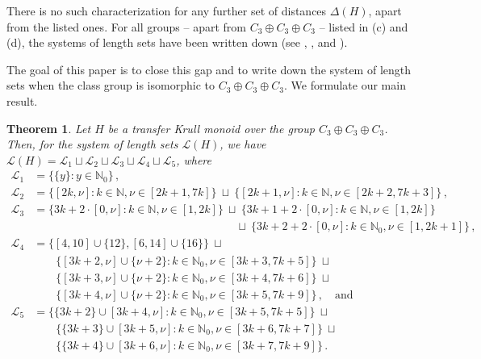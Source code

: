 \documentclass[a4paper, 10pt]{amsart}
\theoremstyle{plain}
\newtheorem{theorem}{\bf Theorem}[section]
\theoremstyle{definition}
\theoremstyle{definition}
\newcommand{\N}{\mathbb N}
\numberwithin{equation}{section}
\begin{document}
There is no such characterization for any further set of distances $\Delta (H)$, apart from the listed ones. For all groups -- apart from $C_3 \oplus C_3 \oplus C_3$ --  listed in (c) and (d), the systems of length sets have been written down (see \cite[Theorem 7.3.2]{Ge-HK06a}, \cite[Proposition 3.12]{Ge-Sc16b}, and \cite[Theorem 4.5]{Ge-Sc-Zh17b}).

The goal of this paper is to close this gap and to write down the system of length sets when the class group is isomorphic to $C_3 \oplus C_3 \oplus C_3$. We formulate our main result.


\begin{theorem} \label{1.1}
Let $H$ be a transfer Krull monoid over the group $C_3 \oplus C_3 \oplus C_3$. 
Then, for the system of length sets $\mathcal L (H)$, we have
$\mathcal L (H) = \mathcal L_1\sqcup \mathcal L_2\sqcup \mathcal L_3\sqcup \mathcal L_4\sqcup \mathcal L_5$, where
\begin{align*}
\mathcal L_1&= \big\{\{y\}\colon y\in \N_0  \big\}\,,\\
\mathcal L_2&=\big\{ [2k,\nu] \colon k \in \N, \nu\in [2k+1, 7k]  \big\} \ \sqcup \ \big\{ [2k+1, \nu] \colon  k \in \N, \nu \in [2k+2, 7k+3] \big\}\,, \\
\mathcal L_3
		&=\big\{ 3k+2\cdot[0,\nu] \colon k \in \N, \nu\in [1, 2k] \big\} \ \sqcup \ \big\{3k+1+2\cdot[0, \nu] \colon  k \in \N, \nu \in [1, 2k] \big\}  \\
		&\phantom{ =\big\{3k+2\cdot[0,\nu] \colon k \in \N, \nu\in [1, 2k] \big\} \cup }  \sqcup \ \big\{3k+2+2\cdot[0, \nu] \colon  k \in \N_0, \nu \in [1, 2k+1] \big\}\,,  \\
\mathcal L_4 & =  \big\{ [4,10]\cup\{12\},  [6, 14]\cup\{16\} \big\} \ \sqcup	\\
	& \quad\quad \big\{[3k+2, \nu]\cup\{\nu+2\} \colon k \in \N_0, \nu\in [3k+3, 7k+5] \big\} \ \sqcup \\
	  & \quad\quad \big\{[3k+3, \nu]\cup\{\nu+2\} \colon k \in \N_0, \nu\in [3k+4, 7k+6] \big\} \ \sqcup\\
	 & \quad\quad  \big\{[3k+4, \nu]\cup\{\nu+2\} \colon k \in \N_0, \nu\in [3k+5, 7k+9] \big\}\,, \quad \text{and}  \\           
\mathcal L_5&=\big\{\{3k+2\}\cup[3k+4,\nu] \colon k \in \N_0, \nu\in [3k+5, 7k+5] \big\} \ \sqcup \\
&\quad\quad  \big\{\{3k+3\}\cup[3k+5,\nu] \colon k \in \N_0, \nu\in [3k+6, 7k+7] \big\} \ \sqcup\\
&\quad\quad \big\{\{3k+4\}\cup[3k+6,\nu] \colon k \in \N_0, \nu\in [3k+7, 7k+9] \big\}\,.
	\end{align*}
\end{theorem}
\end{document}
